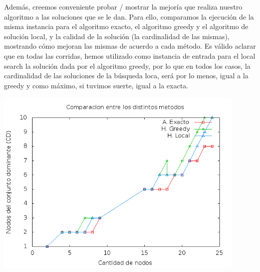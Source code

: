Además, creemos conveniente probar / mostrar la mejoría que realiza nuestro algoritmo a las soluciones que se le dan. Para ello, comparamos la ejecución de la misma instancia para el algoritmo exacto, el algoritmo greedy y el algoritmo de solución local, y la calidad de la solución (la cardinalidad de las mismas), mostrando cómo mejoran las mismas de acuerdo a cada método. Es válido aclarar que en todas las corridas, hemos utilizado como instancia de entrada para el local search la solución  dada por el algoritmo greedy, por lo que en todos los casos, la cardinalidad de las soluciones de la búsqueda loca, será por lo menos, igual a la greedy y como máximo, si tuvimos suerte, igual a la exacta.

\begin{center}
\includegraphics[width=12cm]{./graficos/local_comparacion_soluciones.png}
\end{center}
